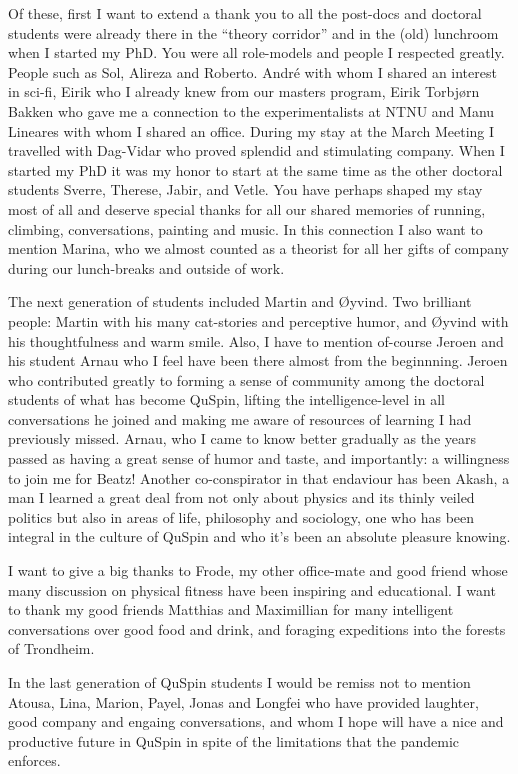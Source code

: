 Of these, first I want to extend a thank you to all the post-docs and doctoral students were already there in the ``theory corridor'' and in the
(old) lunchroom when I started my PhD. You were all
role-models and people I respected greatly. People such as Sol, Alireza and Roberto. Andr\'e with whom I shared an interest in sci-fi, Eirik
who I already knew from our masters program, Eirik Torbjørn Bakken who gave me a connection to the experimentalists at NTNU and Manu Lineares
with whom I shared an office. During my stay at the March Meeting I travelled with Dag-Vidar who proved splendid and
stimulating company.
When I started my PhD it was my honor to start at the same time as the other doctoral students Sverre, Therese, Jabir, and Vetle.
You have perhaps shaped my stay most of all and deserve special thanks for all our shared memories of running, climbing,
conversations, painting and music. In this connection I also want to mention Marina, who we almost counted as a theorist
for all her gifts of company during our lunch-breaks and outside of work.

The next generation of students included Martin and Øyvind. Two brilliant people: Martin with his many cat-stories and
perceptive humor, and Øyvind with his thoughtfulness and warm smile. Also, I have to mention of-course Jeroen and his student
Arnau who I feel have been there almost from the beginnning. Jeroen who contributed greatly to forming a sense
of community among the doctoral students of what has become QuSpin, lifting the intelligence-level in all conversations
he joined and making me aware of resources of learning I had previously missed. Arnau, who I came to know better gradually as the
years passed as having a great sense of humor and taste, and importantly: a willingness to join me for Beatz! Another
co-conspirator in that endaviour has been Akash, a man I learned a great deal from not only about physics and its
thinly veiled politics but also in areas of life, philosophy and sociology, one who has been integral in the culture
of QuSpin and who it's been an absolute pleasure knowing.

I want to give a big thanks to Frode, my other office-mate and good friend whose many discussion on physical fitness
have been inspiring and educational. I want to thank my good friends Matthias and Maximillian for many intelligent
conversations over good food and drink, and foraging expeditions into the forests of Trondheim.

In the last generation of QuSpin students I would be remiss not to mention Atousa, Lina, Marion, Payel, Jonas and Longfei
who have provided laughter, good company and engaing conversations, and whom I hope will have a
nice and productive future in QuSpin in spite of the limitations that the pandemic enforces.

